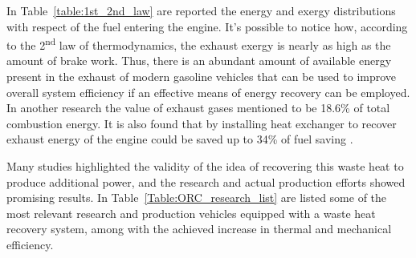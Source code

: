 In Table~\ref{table:1st_2nd_law} are reported the energy and exergy distributions with respect of the fuel entering the engine. It's possible to notice how, according to the 2\textsuperscript{nd} law of thermodynamics, the exhaust exergy is nearly as high as the amount of brake work. Thus, there is an abundant amount of available energy present in the exhaust of modern gasoline vehicles that can be used to improve overall system efficiency if an effective means of energy recovery can be employed. In another research \cite{Dolz2012}  the value of exhaust gases mentioned to be 18.6\% of total combustion energy. It is also found that by installing heat exchanger to recover exhaust energy of the engine could be saved up to 34\% of fuel saving \cite{Wang2013}.

Many studies highlighted the validity of the idea of recovering this waste heat to produce additional power, and the research and actual production efforts showed promising results. In Table~\ref{Table:ORC_research_list} are listed some of the most relevant research and production vehicles equipped with a waste heat recovery system, among with the achieved increase in thermal and mechanical efficiency.

